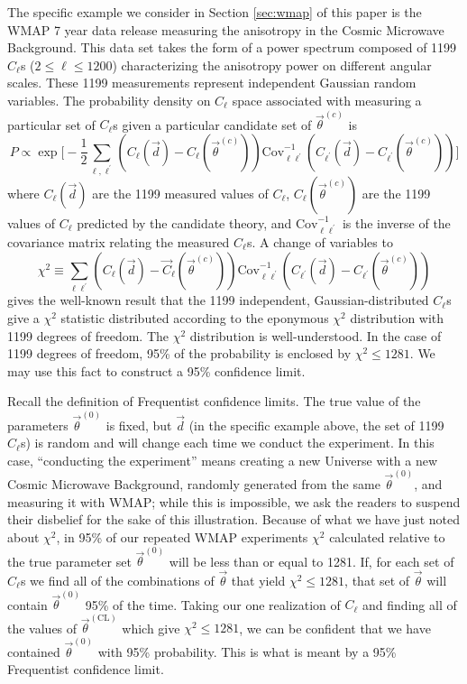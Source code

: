 \documentclass[useAMS,usenatbib]{aastex}
\begin{document}
\begin{appendix}
The specific example we consider in Section \ref{sec:wmap}
of this paper is the WMAP 7 year data
release measuring the anisotropy in the Cosmic Microwave Background.  This 
data set takes the form of a
power spectrum composed of 1199 $C_\ell$s ($2\le\ell\le1200$) 
characterizing the
anisotropy power on different angular scales.  
These 1199 measurements represent
independent Gaussian random variables. 
The probability density on $C_\ell$ space associated with
measuring a particular set of $C_\ell$s given a particular candidate set of
$\vec{\theta}^{(c)}$ is
$$P\propto\exp
\big[-\frac{1}{2}
\sum_{\ell,\ell^\prime}(C_\ell(\vec{d})-C_\ell(\vec{\theta}^{(c)})) 
\text{Cov}^{-1}_{\ell\ell^\prime}
(C_{\ell^\prime}(\vec{d})-C_{\ell^\prime}(\vec{\theta}^{(c)}))\big]$$
where 
$C_\ell(\vec{d})$ are the 1199 measured values of $C_\ell$,
$C_\ell(\vec{\theta}^{(c)})$ are the 1199 values of $C_\ell$ predicted
by the candidate theory,
and $\text{Cov}^{-1}_{\ell\ell^\prime}$ is the inverse of the covariance matrix
relating the measured $C_\ell$s.
A change of variables to
$$\chi^2\equiv \sum_{\ell\ell^\prime}
(C_\ell(\vec{d})-\vec{C}_\ell(\vec{\theta}^{(c)}))
\text{Cov}^{-1}_{\ell\ell^\prime}
(C_{\ell^\prime}(\vec{d})-C_{\ell^\prime}(\vec{\theta}^{(c)}))$$
gives the well-known result that the 1199 independent, Gaussian-distributed
$C_\ell$s give a $\chi^2$ statistic distributed according to the eponymous
$\chi^2$ distribution with 1199 degrees of freedom.  The $\chi^2$ distribution
is well-understood.  In the case of 1199 degrees of freedom, 95\% of the
probability is enclosed by $\chi^2\le1281$.  
We may use this fact to construct a
95\% confidence limit.

Recall the definition of Frequentist confidence limits.  The true
value of the parameters
$\vec{\theta}^{(0)}$ is fixed, but $\vec{d}$ (in the specific example above, the
set of 1199 $C_\ell$s) is random and will change each time we conduct the
experiment.  In this case, ``conducting the experiment'' means creating a new Universe
with a new Cosmic Microwave Background, randomly generated from the same
$\vec{\theta}^{(0)}$, and measuring it with WMAP;
while this is impossible, we ask the readers to
suspend their disbelief for the sake of this illustration.  
Because of what we have just noted about $\chi^2$, in
95\% of our repeated WMAP experiments $\chi^2$ calculated relative to the true
parameter set $\vec{\theta}^{(0)}$ will be less than or equal to 1281.  If, for
each set of $C_\ell$s we find all of the combinations of $\vec{\theta}$ that
yield $\chi^2\le1281$, that set of $\vec{\theta}$ will contain $\vec{\theta}^{(0)}$
95\% of the time.
Taking our one realization of $C_\ell$ and finding all of the values of
$\vec{\theta}^{(\text{CL})}$ which give $\chi^2\le1281$,
we can be confident that we have contained $\vec{\theta}^{(0)}$ with 95\%
probability.  This is what is meant by a 95\% Frequentist confidence limit.


\end{appendix}
\end{document}
